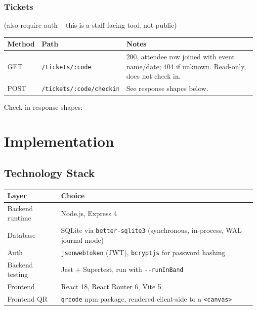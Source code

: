﻿\documentclass[11pt,letterpaper]{report}
\newcommand{\code}[1]{\lstinline[breaklines=true]{#1}}
\begin{document}
\subsection{Tickets} (also require auth -- this is a staff-facing tool, not public)
\begin{center}
\begin{tabular}{p{1.4cm}p{3.8cm}p{7cm}}
\toprule
\textbf{Method} & \textbf{Path} & \textbf{Notes} \\
\midrule
GET & \code{/tickets/:code} & 200, attendee row joined with event name/date; 404 if unknown. Read-only, does not check in. \\
POST & \code{/tickets/:code/checkin} & See response shapes below. \\
\bottomrule
\end{tabular}
\end{center}

Check-in response shapes:

\chapter{Implementation}
\label{ch:implementation}

\section{Technology Stack}

\begin{center}
\begin{tabular}{p{3.2cm}p{9.8cm}}
\toprule
\textbf{Layer} & \textbf{Choice} \\
\midrule
Backend runtime & Node.js, Express 4 \\
Database & SQLite via \code{better-sqlite3} (synchronous, in-process, WAL journal mode) \\
Auth & \code{jsonwebtoken} (JWT), \code{bcryptjs} for password hashing \\
Backend testing & Jest + Supertest, run with \code{--runInBand} \\
Frontend & React 18, React Router 6, Vite 5 \\
Frontend QR & \code{qrcode} npm package, rendered client-side to a \code{<canvas>} \\
\bottomrule
\end{tabular}
\end{center}
\end{document}
